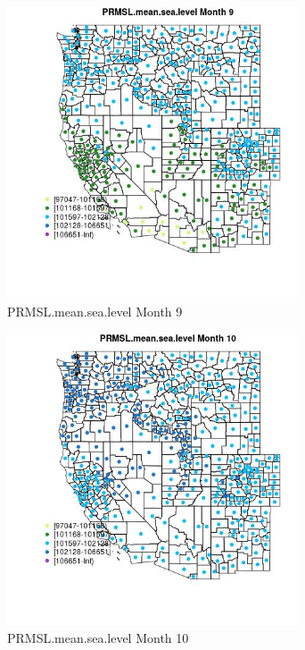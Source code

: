 \begin{figure} 
\centering  
\includegraphics[width=0.77\textwidth]{Code_Outputs/df_report_ML_predictors_CountyCentroid_Locations_Dates_2008-01-01to2018-12-31_MapObsMo9PRMSLmeansealevel.jpg} 
\caption{\label{fig:df_report_ML_predictors_CountyCentroid_Locations_Dates_2008-01-01to2018-12-31MapObsMo9PRMSLmeansealevel}PRMSL.mean.sea.level Month 9} 
\end{figure} 
 

\clearpage 

\begin{figure} 
\centering  
\includegraphics[width=0.77\textwidth]{Code_Outputs/df_report_ML_predictors_CountyCentroid_Locations_Dates_2008-01-01to2018-12-31_MapObsMo10PRMSLmeansealevel.jpg} 
\caption{\label{fig:df_report_ML_predictors_CountyCentroid_Locations_Dates_2008-01-01to2018-12-31MapObsMo10PRMSLmeansealevel}PRMSL.mean.sea.level Month 10} 
\end{figure} 
 

